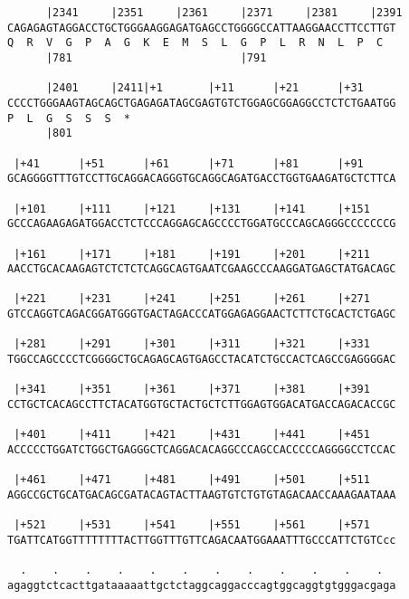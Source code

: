\documentclass{article}
\begin{document}
\begin{Verbatim}
      |2341     |2351     |2361     |2371     |2381     |2391
CAGAGAGTAGGACCTGCTGGGAAGGAGATGAGCCTGGGGCCATTAAGGAACCTTCCTTGT
Q  R  V  G  P  A  G  K  E  M  S  L  G  P  L  R  N  L  P  C  
      |781                          |791                    
  
      |2401     |2411|+1       |+11      |+21      |+31     
CCCCTGGGAAGTAGCAGCTGAGAGATAGCGAGTGTCTGGAGCGGAGGCCTCTCTGAATGG
P  L  G  S  S  S  *   
      |801                                                  
  
 |+41      |+51      |+61      |+71      |+81      |+91     
GCAGGGGTTTGTCCTTGCAGGACAGGGTGCAGGCAGATGACCTGGTGAAGATGCTCTTCA
                                                            
 |+101     |+111     |+121     |+131     |+141     |+151    
GCCCAGAAGAGATGGACCTCTCCCAGGAGCAGCCCCTGGATGCCCAGCAGGGCCCCCCCG
                                                            
 |+161     |+171     |+181     |+191     |+201     |+211    
AACCTGCACAAGAGTCTCTCTCAGGCAGTGAATCGAAGCCCAAGGATGAGCTATGACAGC
                                                            
 |+221     |+231     |+241     |+251     |+261     |+271    
GTCCAGGTCAGACGGATGGGTGACTAGACCCATGGAGAGGAACTCTTCTGCACTCTGAGC
                                                            
 |+281     |+291     |+301     |+311     |+321     |+331    
TGGCCAGCCCCTCGGGGCTGCAGAGCAGTGAGCCTACATCTGCCACTCAGCCGAGGGGAC
                                                            
 |+341     |+351     |+361     |+371     |+381     |+391    
CCTGCTCACAGCCTTCTACATGGTGCTACTGCTCTTGGAGTGGACATGACCAGACACCGC
                                                            
 |+401     |+411     |+421     |+431     |+441     |+451    
ACCCCCTGGATCTGGCTGAGGGCTCAGGACACAGGCCCAGCCACCCCCAGGGGCCTCCAC
                                                            
 |+461     |+471     |+481     |+491     |+501     |+511    
AGGCCGCTGCATGACAGCGATACAGTACTTAAGTGTCTGTGTAGACAACCAAAGAATAAA
                                                            
 |+521     |+531     |+541     |+551     |+561     |+571    
TGATTCATGGTTTTTTTTACTTGGTTTGTTCAGACAATGGAAATTTGCCCATTCTGTCcc
                                                            
  .    .    .    .    .    .    .    .    .    .    .    .  
agaggtctcacttgataaaaattgctctaggcaggacccagtggcaggtgtgggacgaga
                                                            

\end{Verbatim}
\end{document}
